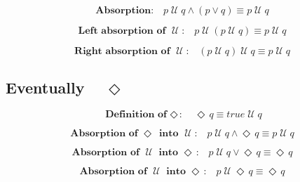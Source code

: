 \documentclass[12pt, fleqn, leqno]{article}
\newcommand{\Until}{\;\mathcal{U}\;}
\newcommand{\Event}{\Diamond\,}
\newcommand{\spacer}{\vspace{-30pt}}
\newcommand{\firstspacer}{\vspace{-26pt}}
\begin{document}
\begin{equation}\label{E:untilAndOr}
\textbf{Absorption:}\quad p \Until q \land (p \lor q) \equiv p \Until q
\end{equation}

\spacer

\begin{equation}\label{E:untilIdem}
\textbf{Left absorption of $\Until$:}\quad p \Until (p \Until q) \equiv p \Until q
\end{equation}

\spacer

\begin{equation}\label{E:untilIdemR}
\textbf{Right absorption of $\Until$:}\quad (p \Until q) \Until q \equiv p \Until q
\end{equation}


\subsection*{Eventually $\quad\Event$}

\begin{equation}\label{E:defEvent}
\textbf{Definition of $\Event$:}\quad \Event q \equiv true \Until q
\end{equation}

\firstspacer

\begin{equation}\label{E:absEventIntoUntil}
\textbf{Absorption of $\Event$ into $\Until$:}\quad p \Until q\land \Event q \equiv p\Until q
\end{equation}

\spacer

\begin{equation}\label{E:absUntilIntoEvent2}
\textbf{Absorption of $\Until$ into $\Event$:}\quad p \Until q \lor \Event q \equiv \Event q
\end{equation}

\spacer

\begin{equation}\label{E:absUntilIntoEvent}
\textbf{Absorption of $\Until$ into $\Event$:}\quad p \Until \Event q \equiv \Event q
\end{equation}
\end{document}
